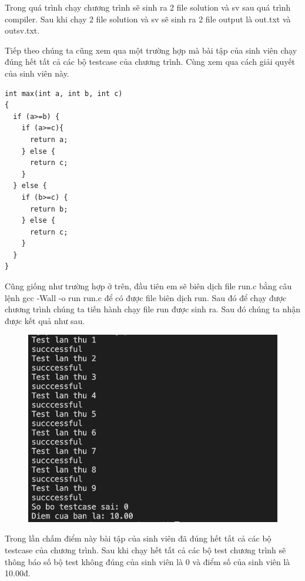 \documentclass[12pt,a4paper]{report}
\begin{document}
Trong quá trình chạy chương trình sẽ sinh ra 2 file solution và sv sau quá trình compiler. Sau khi chạy 2 file solution và sv sẽ sinh ra 2 file output là out.txt và outsv.txt.

Tiếp theo chúng ta cũng xem qua một trường hợp mà bài tập của sinh viên chạy đúng hết tất cả các bộ testcase của chương trình. Cùng xem qua cách giải quyết của sinh viên này.

\begin{lstlisting}
int max(int a, int b, int c) 
{ 
  if (a>=b) {
    if (a>=c){
      return a;
    } else {
      return c;
    } 
  } else {
    if (b>=c) {
      return b;
    } else {
      return c;  
    }
  }
}
\end{lstlisting}

Cũng giống như trường hợp ở trên, đầu tiên em sẽ biên dịch file run.c bằng câu lệnh gcc -Wall -o run run.c để có được file biên dịch run. Sau đó để chạy được chương trình chúng ta tiến hành chạy file run được sinh ra. Sau đó chúng ta nhận được kết quả như sau. \newpage

\begin{figure}[ht]
\begin{center}
\includegraphics[scale=.3]{hinhanh/ketquademodung.png}
\end{center}
\end{figure}

Trong lần chấm điểm này bài tập của sinh viên đã đúng hết tất cả các bộ testcase của chương trình. Sau khi chạy hết tất cả các bộ test chương trình sẽ thông báo số bộ test không đúng của sinh viên là 0 và điểm số của sinh viên là 10.00đ.
\end{document}
